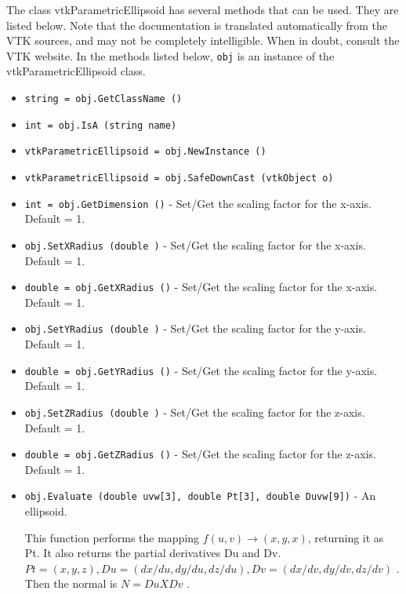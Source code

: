 The class vtkParametricEllipsoid has several methods that can be used.
  They are listed below.
Note that the documentation is translated automatically from the VTK sources,
and may not be completely intelligible.  When in doubt, consult the VTK website.
In the methods listed below, \verb|obj| is an instance of the vtkParametricEllipsoid class.
\begin{itemize}
\item  \verb|string = obj.GetClassName ()|

\item  \verb|int = obj.IsA (string name)|

\item  \verb|vtkParametricEllipsoid = obj.NewInstance ()|

\item  \verb|vtkParametricEllipsoid = obj.SafeDownCast (vtkObject o)|

\item  \verb|int = obj.GetDimension ()| -  Set/Get the scaling factor for the x-axis. Default = 1.

\item  \verb|obj.SetXRadius (double )| -  Set/Get the scaling factor for the x-axis. Default = 1.

\item  \verb|double = obj.GetXRadius ()| -  Set/Get the scaling factor for the x-axis. Default = 1.

\item  \verb|obj.SetYRadius (double )| -  Set/Get the scaling factor for the y-axis. Default = 1.

\item  \verb|double = obj.GetYRadius ()| -  Set/Get the scaling factor for the y-axis. Default = 1.

\item  \verb|obj.SetZRadius (double )| -  Set/Get the scaling factor for the z-axis. Default = 1.

\item  \verb|double = obj.GetZRadius ()| -  Set/Get the scaling factor for the z-axis. Default = 1.

\item  \verb|obj.Evaluate (double uvw[3], double Pt[3], double Duvw[9])| -  An ellipsoid.

 This function performs the mapping $f(u,v) \rightarrow (x,y,x)$, returning it
 as Pt. It also returns the partial derivatives Du and Dv.
 $Pt = (x, y, z), Du = (dx/du, dy/du, dz/du), Dv = (dx/dv, dy/dv, dz/dv)$ .
 Then the normal is $N = Du X Dv$ .


\end{itemize}
